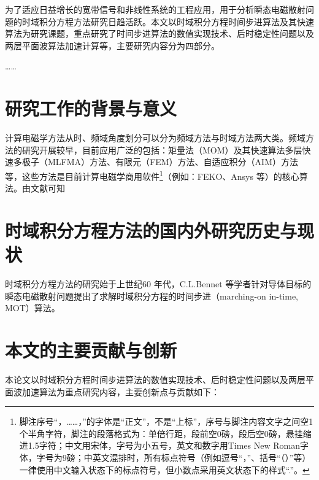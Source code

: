 \documentclass[bachelor]{thesis-uestc}
\begin{document}
\begin{chineseabstract}
为了适应日益增长的宽带信号和非线性系统的工程应用，用于分析瞬态电磁散射问题的时域积分方程方法研究日趋活跃。本文以时域积分方程时间步进算法及其快速算法为研究课题，重点研究了时间步进算法的数值实现技术、后时稳定性问题以及两层平面波算法加速计算等，主要研究内容分为四部分。

……

\end{chineseabstract}


\thesischapterexordium

\section{研究工作的背景与意义}

计算电磁学方法从时、频域角度划分可以分为频域方法与时域方法两大类。频域方法的研究开展较早，目前应用广泛的包括：矩量法（MOM）及其快速算法多层快速多极子（MLFMA）方法、有限元（FEM）方法、自适应积分（AIM）方法等，这些方法是目前计算电磁学商用软件\footnote{脚注序号“，……，”的字体是“正文”，不是“上标”，序号与脚注内容文字之间空1个半角字符，脚注的段落格式为：单倍行距，段前空0磅，段后空0磅，悬挂缩进1.5字符；中文用宋体，字号为小五号，英文和数字用Times New Roman字体，字号为9磅；中英文混排时，所有标点符号（例如逗号“，”、括号“（）”等）一律使用中文输入状态下的标点符号，但小数点采用英文状态下的样式“.”。}（例如：FEKO、Ansys 等）的核心算法。由文献\cite{feng997he,clerc2010discrete,xiao2012yi}可知

\section{时域积分方程方法的国内外研究历史与现状}
时域积分方程方法的研究始于上世纪60 年代，C.L.Bennet 等学者针对导体目标的瞬态电磁散射问题提出了求解时域积分方程的时间步进（marching-on in-time, MOT）算法。

\section{本文的主要贡献与创新}
本论文以时域积分方程时间步进算法的数值实现技术、后时稳定性问题以及两层平面波加速算法为重点研究内容，主要创新点与贡献如下：
\end{document}
